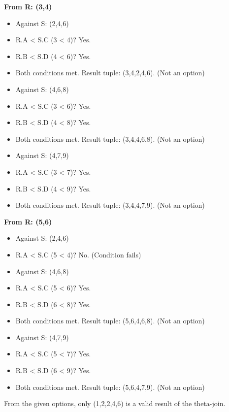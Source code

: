 \documentclass{article}
\begin{document}
\begin{enumerate}[label=\textbf{Question \arabic*.}]
\begin{itemize}
            \textbf{From R: (3,4)}
            \begin{itemize}
                \item Against S: (2,4,6)
                    \item R.A < S.C (3 < 4)? Yes.
                    \item R.B < S.D (4 < 6)? Yes.
                    \item Both conditions met. Result tuple: (3,4,2,4,6). (Not an option)
    
                \item Against S: (4,6,8)
                    \item R.A < S.C (3 < 6)? Yes.
                    \item R.B < S.D (4 < 8)? Yes.
                    \item Both conditions met. Result tuple: (3,4,4,6,8). (Not an option)
    
                \item Against S: (4,7,9)
                    \item R.A < S.C (3 < 7)? Yes.
                    \item R.B < S.D (4 < 9)? Yes.
                    \item Both conditions met. Result tuple: (3,4,4,7,9). (Not an option)
            \end{itemize}
    
            \textbf{From R: (5,6)}
            \begin{itemize}
                \item Against S: (2,4,6)
                    \item R.A < S.C (5 < 4)? No. (Condition fails)
    
                \item Against S: (4,6,8)
                    \item R.A < S.C (5 < 6)? Yes.
                    \item R.B < S.D (6 < 8)? Yes.
                    \item Both conditions met. Result tuple: (5,6,4,6,8). (Not an option)
    
                \item Against S: (4,7,9)
                    \item R.A < S.C (5 < 7)? Yes.
                    \item R.B < S.D (6 < 9)? Yes.
                    \item Both conditions met. Result tuple: (5,6,4,7,9). (Not an option)
            \end{itemize}
            From the given options, only (1,2,2,4,6) is a valid result of the theta-join.
        \end{itemize}
    
    \end{enumerate}    
\end{document}
